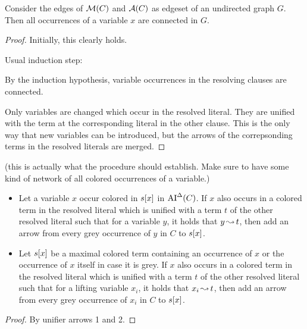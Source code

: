 \documentclass[,%
	paper=a4,%
	DIV10, %
	twoside=false,%
	liststotoc,
	bibtotoc,
	draft=false,%
	numbers=noendperiod
]{scrartcl}
\begin{document}
\begin{prop}
	\label{prop:colored_variables_connected}
	Consider the edges of $\operatorname{\mathcal{M}}(C)$ and $\operatorname{\mathcal{A}}(C)$ as edgeset of an undirected graph $G$.
	Then all occurrences of a variable $x$ are connected in $G$.
\end{prop}
\begin{proof}
	Initially, this clearly holds.

	Usual induction step:

	By the induction hypothesis, variable occurrences in the resolving clauses are connected.

	Only variables are changed which occur in the resolved literal.
	They are unified with the term at the corresponding literal in the other clause.
	This is the only way that new variables can be introduced, but the arrows of the correpsonding terms in the resolved literals are merged.
\end{proof}

\begin{lemma}(this is actually what the procedure should establish. Make sure to have some kind of network of all colored occurrences of a variable.)\nopagebreak 
	\label{lemma:colored_merge_ai_de}

	\begin{itemize}
		\item
			Let a variable $x$ occur colored in $s[x]$ in $\operatorname{AI}^\Delta(C)$.
			If $x$ also occurs in a colored term in the resolved literal which is unified with a term $t$ of the other resolved literal such that for a variable $y$, it holds that $y\operatorname{\leadsto} t$, then add an arrow from every grey occurrence of $y$ in $C$ to $s[x]$.
		\item 

			Let $s[x]$ be a maximal colored term containing an occurrence of $x$ or the occurrence of $x$ itself in case it is grey.
			If $x$ also occurs in a colored term in the resolved literal which is unified with a term $t$ of the other resolved literal 
			such that for a lifting variable $x_i$, it holds that $x_i \operatorname{\leadsto} t$, then add an arrow from every grey occurrence of $x_i$ in $C$ to $s[x]$.
	\end{itemize}


\end{lemma}
\begin{proof}
	By unifier arrows 1 and 2.
\end{proof}
\end{document}
